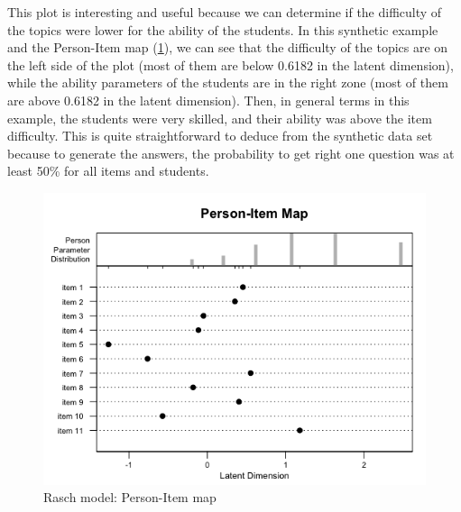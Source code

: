 This plot is interesting and useful because we can determine if the difficulty of the topics were lower for the ability of the students. In this synthetic example and the Person-Item map (\cref{img:rasch_personitem}), we can see that the difficulty of the topics are on the left side of the plot (most of them are below 0.6182 in the latent dimension), while the ability parameters of the students are in the right zone (most of them are above 0.6182 in the latent dimension). Then, in general terms in this example, the students were very skilled, and their ability was above the item difficulty. This is quite straightforward to deduce from the synthetic data set because to generate the answers, the probability to get right one question was at least 50\% for all items and students.

\begin{figure}[ht!]
  \centering
  \includegraphics[width=.75\linewidth]{img/rasch_personitem.png}
  \caption{Rasch model: Person-Item map}
  \label{img:rasch_personitem}
\end{figure}
